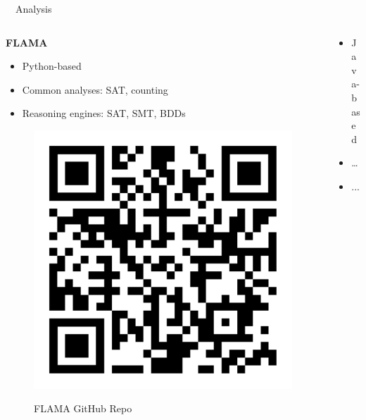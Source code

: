\documentclass[
	aspectratio=169, %
	8pt, %
	nosectionframes, %
]{beamer}
\newcommand{\inlinesubtitle}[1]{\textcolor{gray!60}{~{}~#1}}
\begin{document}
\begin{frame}{\insertsection \inlinesubtitle{Analysis}}
    \vspace{0.4cm}
    \begin{columns}[t]
		\begin{column}{0.49\textwidth}
			\textbf{FLAMA}
            \begin{itemize}
                \item Python-based
                \item Common analyses: SAT, counting
                \item Reasoning engines: SAT, SMT, BDDs
            \end{itemize}
            \begin{figure}
                \centering
                \includegraphics[width=0.5\columnwidth]{pics/qr/flama.pdf}
                
                FLAMA GitHub Repo
            \end{figure}
		\end{column}%
		\begin{column}{0.49\textwidth}
            \begin{itemize}
                \item Java-based
                \item \dots
                \item ...
            \end{itemize}
            \begin{figure}
                \centering
               
            \end{figure}
		\end{column}
	\end{columns}
\end{frame}
\end{document}
